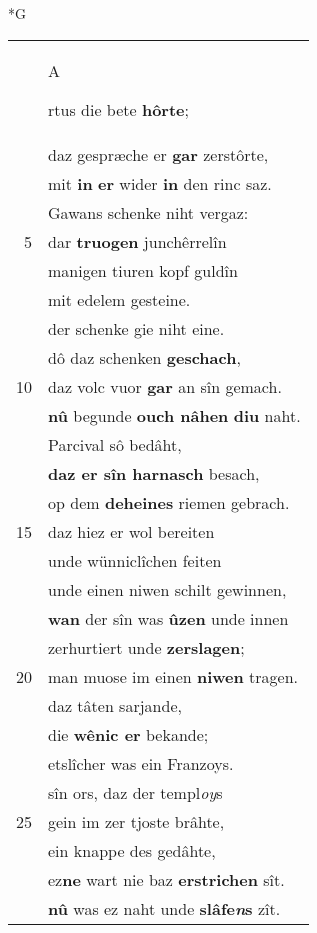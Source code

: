 \documentclass[8pt,a4paper,notitlepage]{article}
\begin{document}
\begin{table}[ht]
\begin{minipage}[t]{0.5\linewidth}
\small
\begin{center}*G
\end{center}
\begin{tabular}{rl}
 & \begin{large}A\end{large}rtus die bete \textbf{hôrte};\\ 
 & daz gespræche er \textbf{gar} zerstôrte,\\ 
 & mit \textbf{in} \textbf{er} wider \textbf{in} den rinc saz.\\ 
 & Gawans schenke niht vergaz:\\ 
5 & dar \textbf{truogen} junchêrrelîn\\ 
 & manigen tiuren kopf guldîn\\ 
 & mit edelem gesteine.\\ 
 & der schenke gie niht eine.\\ 
 & dô daz schenken \textbf{geschach},\\ 
10 & daz volc vuor \textbf{gar} an sîn gemach.\\ 
 & \textbf{nû} begunde \textbf{ouch nâhen} \textbf{diu} naht.\\ 
 & Parcival sô bedâht,\\ 
 & \textbf{daz er sîn harnasch} besach,\\ 
 & op dem \textbf{deheines} riemen gebrach.\\ 
15 & daz hiez er wol bereiten\\ 
 & unde wünniclîchen feiten\\ 
 & unde einen niwen schilt gewinnen,\\ 
 & \textbf{wan} der sîn was \textbf{ûzen} unde innen\\ 
 & zerhurtiert unde \textbf{zerslagen};\\ 
20 & man muose im einen \textbf{niwen} tragen.\\ 
 & daz tâten sarjande,\\ 
 & die \textbf{wênic er} bekande;\\ 
 & etslîcher was ein Franzoys.\\ 
 & sîn ors, daz der templ\textit{oy}s\\ 
25 & gein im zer tjoste brâhte,\\ 
 & ein knappe des gedâhte,\\ 
 & ez\textbf{ne} wart nie baz \textbf{erstrichen} sît.\\ 
 & \textbf{nû} was ez naht unde \textbf{slâfe\textit{n}s} zît.\\ 

\end{tabular}
\end{minipage}
\end{table}
\end{document}

